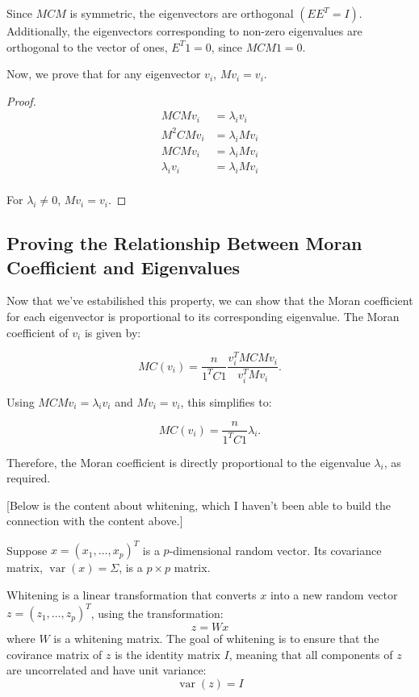 \documentclass[12pt]{article}
\begin{document}
Since \( M C M \) is symmetric, the eigenvectors are orthogonal \( \left(E E^T = I \right) \). Additionally, the eigenvectors corresponding to non-zero eigenvalues are orthogonal to the vector of ones, \( E^T 1 = 0 \), since \( M C M 1 = 0 \).

Now, we prove that for any eigenvector \( v_i \), \( M v_i = v_i \).

\begin{proof}
  \begin{align*}
    M C M v_i & = \lambda_i v_i \\
    M^2 C M v_i & = \lambda_i M v_i \\
    M C M v_i & = \lambda_i M v_i \\
    \lambda_i v_i & = \lambda_i M v_i \\
  \end{align*}

  For \( \lambda_i \neq 0 \), \( M v_i = v_i \).
\end{proof}

\subsection*{Proving the Relationship Between Moran Coefficient and Eigenvalues}

Now that we've estabilished this property, we can show that the Moran coefficient for each eigenvector is proportional to its corresponding eigenvalue. The Moran coefficient of \( v_i \) is given by:

\[
  M C (v_i)=\frac{n}{1^T C 1} \frac{v_i^T M C M v_i}{v_i^T M v_i} .
\]

Using \( M C M v_i = \lambda_i v_i \) and \( M v_i = v_i \), this simplifies to:

\[
  M C (v_i)=\frac{n}{1^T C 1} \lambda_i.
\]

Therefore, the Moran coefficient is directly proportional to the eigenvalue \( \lambda_i \), as required.

[Below is the content about whitening, which I haven't been able to build the connection with the content above.]

Suppose \( x=\left(x_1, \ldots, x_p\right)^T \) is a \( p \)-dimensional random vector. Its covariance matrix, \( \operatorname{var} (x) = \Sigma \), is a  \( p \times p \) matrix.

Whitening is a linear transformation that converts \( x \) into a new random vector \( z=\left(z_1, \ldots, z_p\right)^T \), using the transformation:
\[
  z = W x
\]
where \( W \) is a whitening matrix. The goal of whitening is to ensure that the covirance matrix of \( z \) is the identity matrix \( I \), meaning that all components of \( z \) are uncorrelated and have unit variance:
\[
  \operatorname{var}(z)=I
\]
\end{document}
